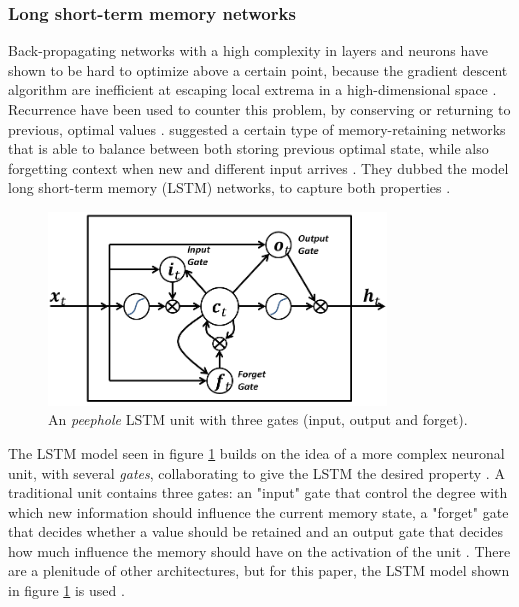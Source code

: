 \documentclass[a4paper]{article}
\begin{document}
\subsubsection{Long short-term memory networks}
Back-propagating networks with a high complexity in layers and neurons have
shown to be hard to optimize above a certain point, because the gradient
descent algorithm are inefficient at escaping local extrema in a high-dimensional
space \citep{Russell2009}. Recurrence have been used to counter this problem,
by conserving \emdash or returning to \emdash previous, optimal values
\citep{Schmidhuber2015, Russell2009}. \cite{Hochreiter1997} suggested a certain
type of memory-retaining networks that is able to balance between both
storing previous optimal state, while also forgetting context when new and
different input arrives \citep{Hochreiter1997, Schmidhuber2015}.
They dubbed the model long short-term memory (LSTM) networks, to capture both
properties \citep{Hochreiter1997}.

\begin{figure}
  \centering
  \includegraphics[width=0.8\textwidth]{lstm.png}
  \caption{An \textit{peephole} LSTM unit with three gates (input, output and forget).}
  \label{fig:lstm}
\end{figure}

The LSTM model seen in figure \ref{fig:lstm} builds on the idea of a more
complex neuronal unit, with several \textit{gates}, collaborating to give
the LSTM the desired property \citep{Gers2001}. A traditional unit contains
three gates: an "input" gate that control the degree with which new information
should influence the current memory state, a "forget" gate that decides whether
a value should be retained and an output gate that decides how much influence
the memory should have on the activation of the unit \citep{Hochreiter1997, Gers2001}.
There are a plenitude of other architectures, but for this paper, the LSTM
model shown in figure \ref{fig:lstm} is used \citep{Gers2001}.
\end{document}

